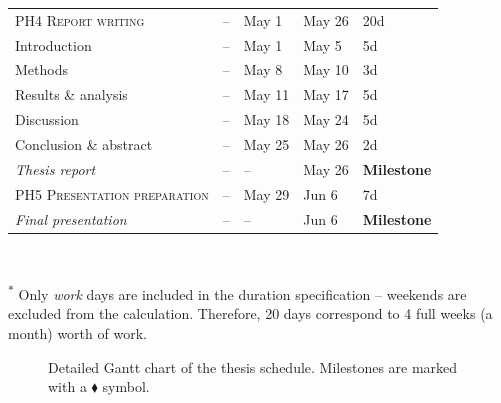 \documentclass[a4paper,fontsize=11pt,bibliography=totoc]{scrartcl}
\begin{document}
\begin{table}[h!]
\begin{tabular}{lllll}
\textsc{PH4 Report writing} & -- & May 1 & May 26 & 20d \\
\hspace{1em}Introduction & -- & May 1 & May 5 & 5d \\
\hspace{1em}Methods & -- & May 8 & May 10 & 3d \\
\hspace{1em}Results \& analysis & -- & May 11 & May 17 & 5d \\
\hspace{1em}Discussion & -- & May 18 & May 24 & 5d \\
\hspace{1em}Conclusion \& abstract & -- & May 25 & May 26 & 2d \\
\textit{Thesis report} & -- & -- & May 26 & \textbf{Milestone} \\[0.5em]
\textsc{PH5 Presentation preparation} & -- & May 29 & Jun 6 & 7d \\
\textit{Final presentation} & -- & -- & Jun 6 & \textbf{Milestone} \\
\bottomrule
\end{tabular}
{\\[0.5em] \footnotesize \parbox{0.95\linewidth}{\textsuperscript{$\ast$} Only \textit{work} days are included in the duration specification -- weekends are excluded from the calculation. Therefore, 20 days correspond to 4 full weeks (a month) worth of work.}}
\end{table}

\begin{landscape}
\begin{figure}
\centering
{\setlength{\fboxsep}{0pt}}
\caption{Detailed Gantt chart of the thesis schedule. Milestones are marked with a $\blacklozenge$ symbol.}
\label{f:gantt}
\end{figure}
\end{landscape}
\end{document}
